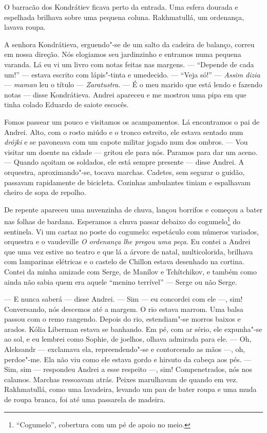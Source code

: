 O barracão dos Kondrátiev ficava perto da entrada. Uma esfera dourada e
espelhada brilhava sobre uma pequena coluna. Rakhmatullá, um ordenança,
lavava roupa.

A senhora Kondrátieva, erguendo"-se de um salto da cadeira de balanço,
correu em nossa direção. Nós elogiamos seu jardinzinho e entramos numa
pequena varanda. Lá eu vi um livro com notas feitas nas margens. ---
``Depende de cada um!'' --- estava escrito com lápis"-tinta e umedecido.
--- ``Veja só!'' --- \emph{Assim dizia} --- \emph{maman} leu o título %
--- \emph{Zaratustra}. --- É o meu marido que está lendo e fazendo notas
--- disse Kondrátieva. Andrei apareceu e me mostrou uma pipa em que
tinha colado Eduardo \scalebox{.8}{VII} de saiote escocês.

Fomos passear um pouco e visitamos os acampamentos. Lá encontramos o pai
de Andrei. Alto, com o rosto miúdo e o tronco estreito, ele estava
sentado num \emph{drójki} e se pavoneava com um capote militar jogado
num dos ombros. --- Vou visitar um doente na cidade --- gritou ele para
nós. Paramos para dar um aceno. --- Quando açoitam os soldados, ele está
sempre presente --- disse Andrei. A orquestra, aproximando"-se, tocava
marchas. Cadetes, sem segurar o guidão, passavam rapidamente de
bicicleta. Cozinhas ambulantes tiniam e espalhavam cheiro de sopa de
repolho.

De repente apareceu uma nuvenzinha de chuva, lançou borrifos e começou a
bater nas folhas de bardana. Esperamos a chuva passar debaixo do
cogumelo\footnote{``Cogumelo'', cobertura com um pé de apoio no meio.}
do sentinela. Vi um cartaz no poste do cogumelo: espetáculo com números
variados, orquestra e o vaudeville \emph{O ordenança lhe pregou uma
peça}. Eu contei a Andrei que uma vez estive no teatro e que lá a árvore
de natal, multicolorida, brilhava com lamparinas elétricas e o castelo
de Chillon estava desenhado na cortina. Contei da minha amizade com
Serge, de Manílov e Tchítchikov, e também como ainda não sabia quem era
aquele ``menino terrível'' --- Serge ou não Serge.

--- E nunca saberá --- disse Andrei. --- Sim --- eu concordei com ele
---, sim! Conversando, nós descemos até a margem. O rio estava marrom.
Uma balsa passou com o remo rangendo. Depois do rio, estendiam"-se morros
baixos e arados. Kólia Liberman estava se banhando. Em pé, com ar sério,
ele expunha"-se ao sol, e eu lembrei como Sophie, de joelhos, olhava
admirada para ele. --- Oh, Aleksandr --- exclamava ela, repreendendo"-se
e contorcendo as mãos ---, oh, perdoe"-me. Ela não viu como ele estava
gordo e hirsuto da cabeça aos pés. --- Sim, sim --- respondeu Andrei a
esse respeito ---, sim! Compenetrados, nós nos calamos. Marchas
ressoavam atrás. Peixes marulhavam de quando em vez. Rakhmatullá, como
uma lavadeira, levando um pau de bater roupa e uma muda de roupa branca,
foi até uma passarela de madeira.

